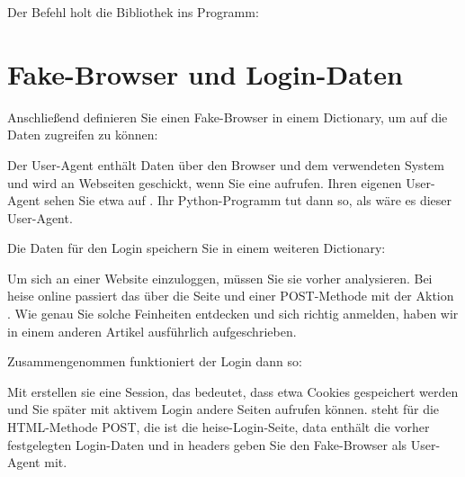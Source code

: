 Der Befehl  holt die Bibliothek ins Programm:

\medskip





\section{Fake-Browser und Login-Daten}

Anschließend definieren Sie einen Fake-Browser in einem Dictionary, um auf die Daten zugreifen zu können:

\medskip


\medskip

Der User-Agent enthält Daten über den Browser und dem verwendeten System und wird an Webseiten geschickt, wenn Sie eine aufrufen. Ihren eigenen User-Agent sehen Sie etwa auf . Ihr Python-Programm tut dann so, als wäre es dieser User-Agent.

Die Daten für den Login speichern Sie in einem weiteren Dictionary:

\medskip


\medskip

Um sich an einer Website einzuloggen, müssen Sie sie vorher analysieren. Bei heise online passiert das über die Seite  und einer POST-Methode mit der Aktion . Wie genau Sie solche Feinheiten entdecken und sich richtig anmelden, haben wir in einem anderen Artikel ausführlich aufgeschrieben.

Zusammengenommen funktioniert der Login dann so:

\medskip


\medskip

Mit  erstellen sie eine Session, das bedeutet, dass etwa Cookies gespeichert werden und Sie später mit aktivem Login andere Seiten aufrufen können.  steht für die HTML-Methode POST, die  ist die heise-Login-Seite, data enthält die vorher festgelegten Login-Daten und in headers geben Sie den Fake-Browser als User-Agent mit.

